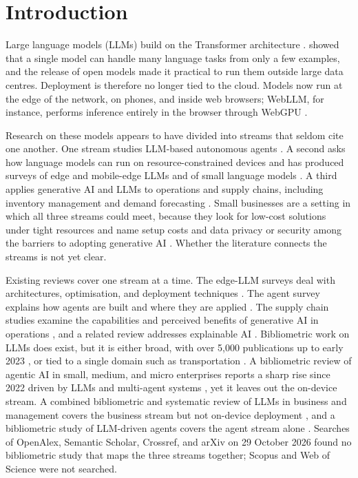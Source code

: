 \section{Introduction}


Large language models (LLMs) build on the Transformer architecture \parencite{vaswani2017}. \textcite{brown2020} showed that a single model can handle many language tasks from only a few examples, and the release of open models \parencite{touvron2023} made it practical to run them outside large data centres. Deployment is therefore no longer tied to the cloud. Models now run at the edge of the network, on phones, and inside web browsers; WebLLM, for instance, performs inference entirely in the browser through WebGPU \parencite{ruan2024webllm}.

Research on these models appears to have divided into streams that seldom cite one another. One stream studies LLM-based autonomous agents \parencite{wang2024agents}. A second asks how language models can run on resource-constrained devices and has produced surveys of edge and mobile-edge LLMs \parencite{friha2024,qu2025,zheng2025} and of small language models \parencite{wang2025slm}. A third applies generative AI and LLMs to operations and supply chains, including inventory management and demand forecasting \parencite{jackson2024,nakhost2025,wamba2023}. Small businesses are a setting in which all three streams could meet, because they look for low-cost solutions under tight resources and name setup costs and data privacy or security among the barriers to adopting generative AI \parencite{alkfairy2025,muzuva2024}. Whether the literature connects the streams is not yet clear.

Existing reviews cover one stream at a time. The edge-LLM surveys deal with architectures, optimisation, and deployment techniques \parencite{friha2024,qu2025,zheng2025}. The agent survey explains how agents are built and where they are applied \parencite{wang2024agents}. The supply chain studies examine the capabilities and perceived benefits of generative AI in operations \parencite{jackson2024,wamba2023}, and a related review addresses explainable AI \parencite{kosasih2023}. Bibliometric work on LLMs does exist, but it is either broad, with over 5,000 publications up to early 2023 \parencite{fan2024}, or tied to a single domain such as transportation \parencite{hassan2025}. A bibliometric review of agentic AI in small, medium, and micro enterprises reports a sharp rise since 2022 driven by LLMs and multi-agent systems \parencite{olujimi2025}, yet it leaves out the on-device stream. A combined bibliometric and systematic review of LLMs in business and management covers the business stream but not on-device deployment \parencite{arslan2026}, and a bibliometric study of LLM-driven agents covers the agent stream alone \parencite{li2025agents}. Searches of OpenAlex, Semantic Scholar, Crossref, and arXiv on 29 October 2026 found no bibliometric study that maps the three streams together; Scopus and Web of Science were not searched.

